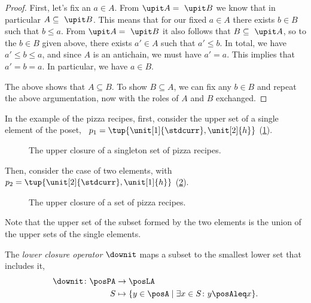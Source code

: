 \begin{proof}
  First, let's fix an $a \in A$. From $\upit  A = \ \upit  B$ we know that in particular $A \subseteq \ \upit  B$. This means that for our fixed $a \in A$ there exists $b \in B$ such that $b \leq a$. From $\upit  A = \ \upit  B$ it also follows that $B \subseteq \ \upit  A$, so to the  $b \in B$ given above, there exists $a' \in A$ such that $a' \leq b$. In total, we have $a' \leq b \leq a$, and since $A$ is an antichain, we must have $a' = a$. This implies that $a' = b = a$. In particular, we have $a \in B$.

  The above shows that $A \subseteq B$. To show $B \subseteq A$, we can fix any $b \in B$ and repeat the above argumentation, now with the roles of $A$ and $B$ exchanged.
\end{proof}

In the example of the pizza recipes, first, consider the upper set of a single element of the poset, \eg ~$p_1=\tup{\unit[1]{\stdcurr},\unit[2]{h}}$  (\cref{fig:upperclosure_1}).
\begin{figure}[h!]
  \begin{center}
  \end{center}
  \caption{The upper closure of a singleton set of pizza recipes. }
  \label{fig:upperclosure_1}
\end{figure}
Then, consider the case of two elements, with~$p_2=\tup{\unit[2]{\stdcurr},\unit[1]{h}}$ (\cref{fig:upperclosure_2}).

\begin{figure}[h!]
  \begin{center}
  \end{center}
  \caption{The upper closure of a set of pizza recipes.  }
  \label{fig:upperclosure_2}
\end{figure}
Note that the upper set of the subset formed by the two elements is the union of the upper sets of the single elements.

\begin{definition}
  \label{def:lowerclosure}
  The \emph{lower closure operator} $\downit$ maps a subset to the smallest lower set that includes it, \ie
  \begin{equation*}
    \begin{aligned}
      \downit \colon \posPA&\to \posLA\\
      S&\mapsto \{ y\in \posA \mid \exists x\in S \colon y\posAleq x\}.
    \end{aligned}
  \end{equation*}
\end{definition}

